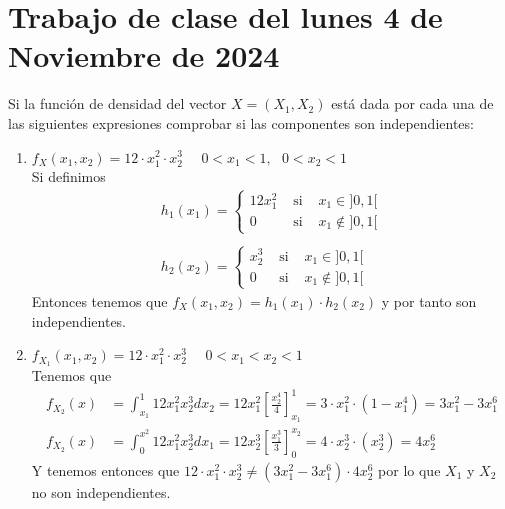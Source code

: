 \section{Trabajo de clase del lunes 4 de Noviembre de 2024}
 
\begin{ejercicio}
    Si la función de densidad del vector $X=(X_1, X_2)$ está dada por cada una de las siguientes expresiones comprobar si las componentes son independientes:
    \begin{enumerate}
        \item $f_X(x_1, x_2) = 12 \cdot x_1^2 \cdot x_2 ^3\ \ \ \ \ \ 0<x_1<1,\ \ \ 0<x_2<1$\\
        Si definimos
        \begin{gather*}
            h_1(x_1)=\left\{
            \begin{array}{ccc}
                12x_1^2 & \text{ si } & x_1 \in ]0,1[\\
                0 & \text{ si } & x_1 \notin ]0,1[
            \end{array}
            \right.
\\\\
            h_2(x_2)=\left\{
            \begin{array}{ccc}
                x_2^3 & \text{ si } & x_1 \in ]0,1[\\
                0 & \text{ si } & x_1 \notin ]0,1[
            \end{array}
            \right.
        \end{gather*}
        Entonces tenemos que $f_X(x_1, x_2) = h_1(x_1) \cdot h_2(x_2)$ y por tanto son independientes.
        \item $f_{X_1}(x_1, x_2) = 12\cdot  x_1^2 \cdot x_2^3\ \ \ \ \ \ 0<x_1<x_2<1$\\
        Tenemos que 
        \begin{align*}
            f_{X_2}(x)&=\int_{x_1}^{1} 12x_1^2x_2^3 dx_2 = 12x_1^2 \left[\frac{x_2^4 }{4}\right]_{x_1}^{1} = 3 \cdot x_1^2 \cdot (1-x_1^4) = 3x_1^2 - 3x_1^6 \\
            f_{X_2}(x)&=\int_{0}^{x^2} 12x_1^2x_2^3 dx_1 = 12x_2^3 \left[\frac{x_1^3 }{3}\right]_{0}^{x_2} = 4 \cdot x_2^3 \cdot (x_2^3) = 4x_2^6
        \end{align*}
        Y tenemos entonces que $12\cdot x_1^2 \cdot x_2^3 \neq (3x_1^2 - 3x_1^6) \cdot 4x_2^6$ por lo que $X_1$ y $X_2$ no son independientes.
    \end{enumerate}
\end{ejercicio}